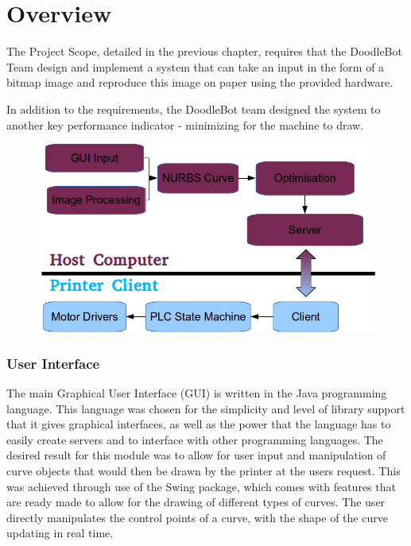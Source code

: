 \section{Overview}
The Project Scope, detailed in the previous chapter, requires that the DoodleBot Team design and implement a system that can take an input in the form of a bitmap image and reproduce this image on paper using the provided hardware. 

In addition to the requirements, the DoodleBot team designed the system to another key performance indicator - minimizing for the machine to draw.



\begin{figure}  
\includegraphics[width=\textwidth]{figures/introduction/system.png}
\caption[System Architecture]{
\label{fig:system}}
\end{figure}

\subsubsection{User Interface} 
The main Graphical User Interface (GUI) is written in the Java programming language. This language was chosen for the simplicity and level of library support that it gives graphical interfaces, as well as the power that the language has to easily create servers and to interface with other programming languages. The desired result for this module was to allow for user input and manipulation of curve objects that would then be drawn by the printer at the users request. This was achieved through use of the Swing package, which comes with features that are ready made to allow for the drawing of different types of curves. The user directly manipulates the control points of a curve, with the shape of the curve updating in real time. 

